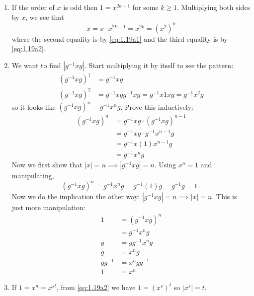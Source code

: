 \documentclass[]{article}
\newcommand{\abs}[1]{\left\vert #1 \right\vert}
\begin{document}
\begin{enumerate}
\item If the order of $x$ is odd then $1 = x^{2k-1}$ for some $k\geq 1$. Multiplying both sides by $x$, we see that \begin{equation}
x = x\cdot x^{2k-1} = x^{2k} = (x^2)^k
\end{equation} where the second equality is by \eqref{eq:1.19a1} and the third equality is by \eqref{eq:1.19a2}.


\item We want to find $\abs{g^{-1}xg}$. Start multiplying it by itself to see the pattern:
\begin{align}
\left(g^{-1}xg\right)^1 &= g^{-1}xg \\
\left(g^{-1}xg\right)^2 &= g^{-1}xgg^{-1}xg = g^{-1}x1xg = g^{-1}x^2g 
\end{align}
so it looks like $\left(g^{-1}xg\right)^n = g^{-1}x^ng$. Prove this inductively:
\begin{align}
\left(g^{-1}xg\right)^n &= g^{-1}xg\cdot \left(g^{-1}xg\right)^{n-1} \\
&= g^{-1}xg\cdot g^{-1}x^{n-1}g \\
&= g^{-1}x(1)x^{n-1}g \\
&= g^{-1}x^{n}g 
\end{align}
Now we first show that $\abs{x} = n \implies \abs{g^{-1}xg} = n$. Using $x^n = 1$ and manipulating,
\begin{equation}
\left(g^{-1}xg\right)^n = g^{-1}x^{n}g = g^{-1}(1)g = g^{-1}g = 1\ .
\end{equation}
Now we do the implication the other way: $\abs{g^{-1}xg} = n \implies \abs{x} = n$. This is just more manipulation:
\begin{align}
1 &= \left(g^{-1}xg\right)^n \\
&= g^{-1}x^{n}g \\
g &= g g^{-1}x^n g \\
g &= x^n g \\
gg^{-1} &= x^n gg^{-1} \\
1 &= x^n
\end{align}


\item If $1 = x^n = x^{st}$, from \eqref{eq:1.19a2} we have $1 = (x^s)^t$ so $\abs{x^s} = t$.



\end{enumerate}
\end{document}
